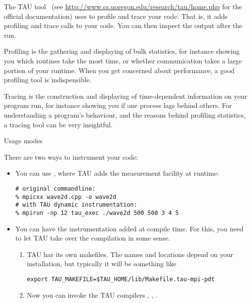 

The TAU tool~\cite{TAU:ijhpca}
(see \url{http://www.cs.uoregon.edu/research/tau/home.php} for the official documentation)
uses  to profile and trace your code. That is, it adds 
profiling and trace calls to your code. You can then inspect
the output after the run.

Profiling is the
gathering and displaying of bulk statistics, for instance showing you
which routines take the most time, or whether communication takes a
large portion of your runtime. When you get concerned about
performance, a good profiling tool is indispensible.

Tracing is the construction and displaying of time-dependent
information on  your program run, for instance showing you if one
process lags behind others. For understanding a program's behaviour,
and the reasons behind profiling statistics, a tracing tool can be
very insightful.

 {Usage modes}

There are two ways to instrument your code:
\begin{itemize}
\item You can use , where TAU adds the measurement facility at runtime:
\begin{verbatim}
# original commandline:
% mpicxx wave2d.cpp -o wave2d
# with TAU dynamic instrumentation:
% mpirun -np 12 tau_exec ./wave2d 500 500 3 4 5
\end{verbatim}
\item You can have the instrumentation added at compile time. For
  this, you need to let TAU take over the compilation in some sense.
  \begin{enumerate}
  \item TAU has its own makefiles. The names and locations depend on
    your installation, but typically it will be something like
\begin{verbatim}
export TAU_MAKEFILE=$TAU_HOME/lib/Makefile.tau-mpi-pdt
\end{verbatim}
  \item Now you can invoke the TAU compilers , , .
  \end{enumerate}
\end{itemize}

